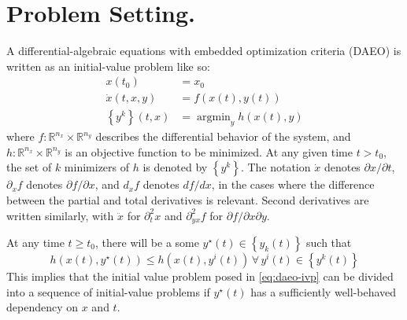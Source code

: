 \documentclass[twoside,leqno,twocolumn]{article}
\DeclareMathOperator*{\argmin}{\arg\min}
\newcommand{\bbR}{\ensuremath{\mathbb{R}}}
\begin{document}
\section{Problem Setting.}
A differential-algebraic equations with embedded optimization criteria (DAEO) is written as an initial-value problem like so:
\begin{equation} \label{eq:daeo-ivp}
\begin{aligned}
	x(t_0) &= x_0\\
	\dot{x}(t, x, y) &= f(x(t), y(t))\\
	\left\{y^k\right\}(t, x) &= \argmin_{y}h(x(t), y)
\end{aligned}
\end{equation}
where $f:\bbR^{n_x}\times\bbR^{n_y}$ describes the differential behavior of the system, and $h:\bbR^{n_x}\times\bbR^{n_y}$ is an objective function to be minimized. At any given time $t>t_0$, the set of $k$ minimizers of $h$ is denoted by $\left\{y^k\right\}$. The notation $\dot{x}$ denotes $\partial x/\partial t$, $\partial_x f$ denotes $\partial f/\partial x$, and $d_x f$ denotes $df/dx$, in the cases where the difference between the partial and total derivatives is relevant. Second derivatives are written similarly, with $\ddot{x}$ for $\partial^2_t x$ and $\partial^2_{yx} f$ for $\partial f/\partial x\partial y$.

At any time $t \geq t_0$, there will be a some $y^\star(t)\in\left\{y_k(t)\right\}$ such that
\begin{equation}
	h(x(t), y^\star(t))\leq h(x(t),y^i(t))\, \forall\,y^i(t)\in\left\{y^k(t)\right\} 
\end{equation}
This implies that the initial value problem posed in \eqref{eq:daeo-ivp} can be divided into a sequence of initial-value problems if $y^\star(t)$ has a sufficiently well-behaved dependency on $x$ and $t$. 
\end{document}
